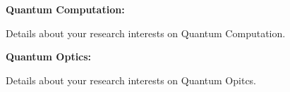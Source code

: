 \documentclass[12pt,a4paper]{report}
\begin{document}
    \begin{center}
        \begin{minipage}[t]{460pt}
            {\textbf{Quantum Computation:}} \par
            \quad Details about your research interests on Quantum Computation. \par
            \vspace{4pt}\par
            {\textbf{Quantum Optics:}} \par
            \quad Details about your research interests on Quantum Opitcs. 
        \end{minipage} \par
    \end{center}
\end{document}
